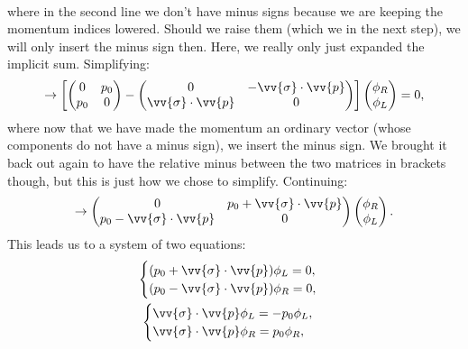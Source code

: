 \begin{itemize}
\begin{gather*}
        \end{gather*}
        where in the second line we don't have minus signs because we are keeping the momentum indices lowered. Should we raise them (which we in the next step), we will only insert the minus sign then. Here, we really only just expanded the implicit sum.
        Simplifying:
        \begin{equation*}
            \rightarrow \left[\begin{pmatrix}0 & p_0 \\ p_0 & 0\end{pmatrix} - \begin{pmatrix}0 & -\vv{\sigma} \cdot \vv{p} \\ \vv{\sigma} \cdot \vv{p} & 0\end{pmatrix}\right] \begin{pmatrix}\phi_R \\ \phi_L\end{pmatrix} = 0,
        \end{equation*}
        where now that we have made the momentum an ordinary vector (whose components do not have a minus sign), we insert the minus sign. We brought it back out again to have the relative minus between the two matrices in brackets though, but this is just how we chose to simplify. Continuing:
        \begin{equation*}
            \rightarrow \begin{pmatrix}0 & p_0 + \vv{\sigma}\cdot\vv{p} \\ p_0 - \vv{\sigma}\cdot\vv{p} & 0\end{pmatrix} \begin{pmatrix} \phi_R \\ \phi_L\end{pmatrix}.
        \end{equation*}
        This leads us to a system of two equations:
        \begin{gather*}
            \begin{cases}
                (p_0 + \vv{\sigma}\cdot\vv{p})\phi_L = 0, \\
                (p_0 - \vv{\sigma}\cdot\vv{p})\phi_R = 0,
            \end{cases} \\
            \begin{cases}
                \vv{\sigma}\cdot\vv{p} \phi_L = -p_0 \phi_L, \\
                \vv{\sigma}\cdot\vv{p} \phi_R = p_0 \phi_R,
            \end{cases}

\end{gather*}
\end{itemize}
